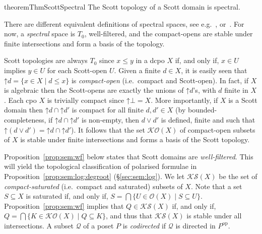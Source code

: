 \documentclass[%
  a4paper,
  UKenglish,
  cleveref,
  autoref,
  thm-restate,
  numberwithinsect,
]{lipics-v2021}
\newcommand\sle\subseteq
\newcommand\up{\mathord{\uparrow}}
\newcommand\SP{S}			%
\newcommand\op{{\mathrm{op}}}
\newcommand\Open{\mathcal{O}}		%
\newcommand\K{\mathcal{K}}		%
\newcommand\Sat{\mathcal{S}}		%
\begin{document}
\begin{restatable}{theorem}{ThmScottSpectral}
\label{thm:spectral}
The Scott topology of a Scott domain is spectral.
\end{restatable}

There are different equivalent definitions of spectral spaces,
see e.g.~\cite[1.1.5]{dst19book},
\cite[\S 6.1]{gg24book} or~\cite[9.5.1]{goubault13book}.
For now, a \emph{spectral} space is $T_0$, well-filtered,
and
the compact-opens are stable under finite intersections and form a basis
of the topology.%
%
%

Scott topologies are always $T_0$ since $x \leq y$ in a dcpo $X$
if, and only if, $x \in U$ implies $y \in U$ for each Scott-open $U$.
%
Given a finite $d \in X$, it is easily seen that 
$\up d = \{ x \in X \mid d \leq x\}$ is
\emph{compact-open} (i.e.\ compact and Scott-open).
%
In fact,
if $X$ is algebraic then the Scott-opens are exactly the unions of $\up d$'s,
with $d$ finite in $X$.
%
Each cpo $X$ is trivially compact since $\up \bot = X$.
More importantly,
if $X$ is a Scott domain then $\up d \cap \up d'$
is compact for all finite $d,d' \in X$
(by bounded-completeness,
if $\up d \cap \up d'$ is non-empty, then $d \vee d'$
is defined, finite and such that $\up (d \vee d') = \up d \cap \up d'$).
%
It follows that the set $\K\Open(X)$ of compact-open subsets of $X$
is stable under finite intersections and forms
a basis of the Scott topology.

Proposition~\ref{prop:sem:wf} below states that Scott domains are \emph{well-filtered}.
This will yield the topological classification of 
polarised formulae in Proposition~\ref{prop:sem:log:degroot} (\S\ref{sec:sem:log}).
%
We let $\K\Sat(X)$ be the set of \emph{compact-saturated}
(i.e.\ compact and saturated) subsets of $X$.
Note that a set $\SP \sle X$ is saturated if, and only if,
$\SP = \bigcap \{U \in \Open(X) \mid \SP \sle U \}$.
%
Proposition~\ref{prop:sem:wf}
implies that $Q \in \K\Sat(X)$ if, and only if,
$Q = \bigcap\{K \in \K\Open(X) \mid Q \sle K \}$,
and thus that $\K\Sat(X)$ is stable under all intersections.
%
A subset $\mathcal{Q}$ of a poset $P$ is \emph{codirected}
if $\mathcal{Q}$ is directed in $P^\op$.
\end{document}
